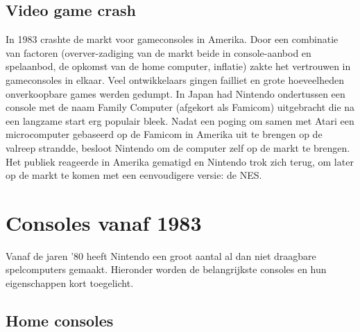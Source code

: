 \documentclass{article}
\begin{document}
\subsection{Video game crash}
In 1983 crashte de markt voor gameconsoles in Amerika. Door een combinatie van factoren (overver-zadiging van de markt beide in console-aanbod en spelaanbod, de opkomst van de home computer, inflatie) zakte het vertrouwen in gameconsoles in elkaar.
Veel ontwikkelaars gingen failliet en grote hoeveelheden onverkoopbare games werden gedumpt. In Japan had Nintendo ondertussen een console met de naam Family Computer (afgekort als Famicom) uitgebracht die na een langzame start erg populair bleek. Nadat een poging om samen met Atari een microcomputer gebaseerd op de Famicom in Amerika uit te brengen op de valreep strandde, besloot Nintendo om de computer zelf op de markt te brengen. Het publiek reageerde in Amerika gematigd en Nintendo trok zich terug, om later op de markt te komen met een eenvoudigere versie: de NES. 

\section{Consoles vanaf 1983}
Vanaf de jaren '80 heeft Nintendo een groot aantal al dan niet draagbare spelcomputers gemaakt. Hieronder worden de belangrijkste consoles en hun eigenschappen kort toegelicht. 
\subsection{Home consoles}
\end{document}
